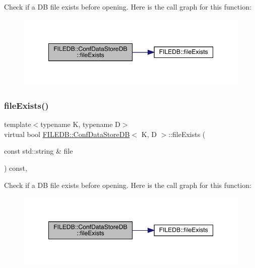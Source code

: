 Check if a DB file exists before opening. Here is the call graph for this function\+:
\nopagebreak
\begin{figure}[H]
\begin{center}
\leavevmode
\includegraphics[width=349pt]{d8/d19/classFILEDB_1_1ConfDataStoreDB_aec1d15aa66421b99e7cd1151e12d2f17_cgraph}
\end{center}
\end{figure}
\mbox{\label{classFILEDB_1_1ConfDataStoreDB_aec1d15aa66421b99e7cd1151e12d2f17}} 
\subsubsection{\texorpdfstring{fileExists()}{fileExists()}\hspace{0.1cm}{\footnotesize\ttfamily [2/2]}}
{\footnotesize\ttfamily template$<$typename K, typename D$>$ \\
virtual bool \mbox{\hyperlink{classFILEDB_1_1ConfDataStoreDB}{F\+I\+L\+E\+D\+B\+::\+Conf\+Data\+Store\+DB}}$<$ K, D $>$\+::file\+Exists (\begin{DoxyParamCaption}\item[{const std\+::string \&}]{file }\end{DoxyParamCaption}) const\hspace{0.3cm}{\ttfamily [inline]}, {\ttfamily [virtual]}}

Check if a DB file exists before opening. Here is the call graph for this function\+:
\nopagebreak
\begin{figure}[H]
\begin{center}
\leavevmode
\includegraphics[width=349pt]{d8/d19/classFILEDB_1_1ConfDataStoreDB_aec1d15aa66421b99e7cd1151e12d2f17_cgraph}
\end{center}
\end{figure}
\mbox{\label{classFILEDB_1_1ConfDataStoreDB_a982ae3b2108acbf75ab15a939fc7871b}} 
